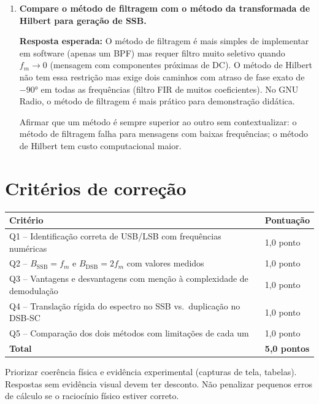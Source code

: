 \documentclass[11pt,a4paper]{article}
\begin{document}
\begin{enumerate}[label=\textbf{Q\arabic*.}, leftmargin=*, itemsep=1em]
    \begin{nota}
      Confundir erro de \emph{frequência} ($\Delta f$, deslocamento espectral) com erro
      de \emph{fase} ($\theta$, atenuação por $\cos\theta$ ou mistura I/Q). Ou afirmar
      que SSB e DSB-SC têm a mesma sensibilidade ao $\Delta f$, ignorando que no SSB o
      espectro é transladado rigidamente (destruindo harmônicos), enquanto no DSB-SC
      ele é duplicado.
    \end{nota}

  \item \textbf{Compare o método de filtragem com o método da transformada de Hilbert para geração de SSB.}

    \textbf{Resposta esperada:} O método de filtragem é mais simples de implementar em
    software (apenas um BPF) mas requer filtro muito seletivo quando $f_m \to 0$
    (mensagem com componentes próximas de DC). O método de Hilbert não tem essa
    restrição mas exige dois caminhos com atraso de fase exato de $-90°$ em todas as
    frequências (filtro FIR de muitos coeficientes). No GNU Radio, o método de filtragem
    é mais prático para demonstração didática.

    \begin{nota}
      Afirmar que um método é sempre superior ao outro sem contextualizar: o método
      de filtragem falha para mensagens com baixas frequências; o método de Hilbert
      tem custo computacional maior.
    \end{nota}

\end{enumerate}

\section*{Critérios de correção}
\begin{tabular}{ll}
  \toprule
  Critério & Pontuação \\
  \midrule
  Q1 -- Identificação correta de USB/LSB com frequências numéricas         & 1,0 ponto \\
  Q2 -- $B_\text{SSB} = f_m$ e $B_\text{DSB} = 2f_m$ com valores medidos  & 1,0 ponto \\
  Q3 -- Vantagens e desvantagens com menção à complexidade de demodulação  & 1,0 ponto \\
  Q4 -- Translação rígida do espectro no SSB vs.\ duplicação no DSB-SC      & 1,0 ponto \\
  Q5 -- Comparação dos dois métodos com limitações de cada um              & 1,0 ponto \\
  \midrule
  \textbf{Total} & \textbf{5,0 pontos} \\
  \bottomrule
\end{tabular}

\bigskip
\begin{nota}
  Priorizar coerência física e evidência experimental (capturas de tela, tabelas).
  Respostas sem evidência visual devem ter desconto. Não penalizar pequenos erros
  de cálculo se o raciocínio físico estiver correto.
\end{nota}
\end{document}
